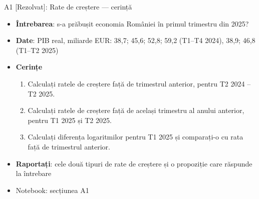 \begin{frame}{A1 [Rezolvat]: Rate de creștere --- cerință}
\itemsize{\small}
\begin{itemize}
\item \textbf{Întrebarea}: s-a prăbușit economia României în primul trimestru din 2025?
\item \textbf{Date}: PIB real, miliarde EUR: 38{,}7; 45{,}6; 52{,}8; 59{,}2 (T1--T4 2024), 38{,}9; 46{,}8 (T1--T2 2025)
\item \textbf{Cerințe}
\begin{enumerate}
    \item Calculați ratele de creștere față de trimestrul anterior, pentru T2 2024 -- T2 2025.
    \item Calculați ratele de creștere față de același trimestru al anului anterior, pentru T1 2025 și T2 2025.
    \item Calculați diferența logaritmilor pentru T1 2025 și comparați-o cu rata față de trimestrul anterior.
\end{enumerate}
\item \textbf{Raportați}: cele două tipuri de rate de creștere și o propoziție care răspunde la întrebare
\item Notebook: secțiunea A1
\end{itemize}
\end{frame}

